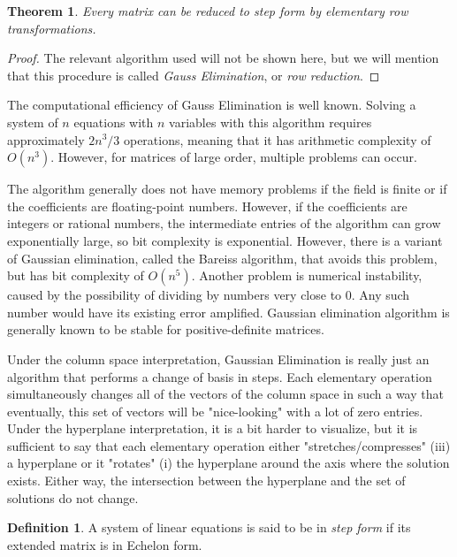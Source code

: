 \documentclass{article}
\newtheorem{theorem}{Theorem}[section]
\theoremstyle{remark}
\theoremstyle{definition}
\newtheorem{definition}{Definition}[section]
\begin{document}
\begin{theorem}
Every matrix can be reduced to step form by elementary row transformations. 
\end{theorem}

\begin{proof}
The relevant algorithm used will not be shown here, but we will mention that this procedure is called \textit{Gauss Elimination}, or \textit{row reduction}. 
\end{proof}

The computational efficiency of Gauss Elimination is well known. Solving a system of $n$ equations with $n$ variables with this algorithm requires approximately $2 n^3 / 3$ operations, meaning that it has arithmetic complexity of $O(n^3)$. However, for matrices of large order, multiple problems can occur. 

The algorithm generally does not have memory problems if the field is finite or if the coefficients are floating-point numbers. However, if the coefficients are integers or rational numbers, the intermediate entries of the algorithm can grow exponentially large, so bit complexity is exponential. However, there is a variant of Gaussian elimination, called the Bareiss algorithm, that avoids this problem, but has bit complexity of $O(n^5)$. Another problem is numerical instability, caused by the possibility of dividing by numbers very close to $0$. Any such number would have its existing error amplified. Gaussian elimination algorithm is generally known to be stable for positive-definite matrices. 

Under the column space interpretation, Gaussian Elimination is really just an algorithm that performs a change of basis in steps. Each elementary operation simultaneously changes all of the vectors of the column space in such a way that eventually, this set of vectors will be "nice-looking" with a lot of zero entries. Under the hyperplane interpretation, it is a bit harder to visualize, but it is sufficient to say that each elementary operation either "stretches/compresses" (iii) a hyperplane or it "rotates" (i) the hyperplane around the axis where the solution exists. Either way, the intersection between the hyperplane and the set of solutions do not change. 

\begin{definition}
A system of linear equations is said to be in \textit{step form} if its extended matrix is in Echelon form. 
\end{definition}
\end{document}
